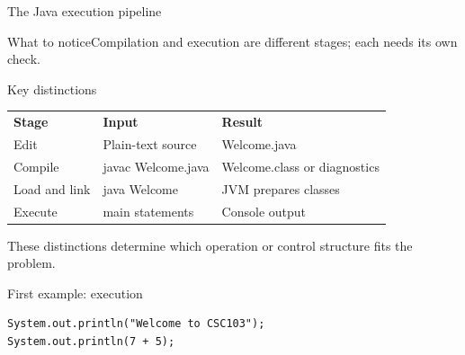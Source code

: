 \documentclass[10pt,aspectratio=169]{beamer}
\begin{document}
\begin{frame}[fragile,t]{The Java execution pipeline}
\begin{center}\end{center}
\begin{block}{What to notice}Compilation and execution are different stages; each needs its own check.\end{block}
\end{frame}
\begin{frame}[fragile,t]{Key distinctions}
\small\renewcommand{\arraystretch}{1.5}
\begin{tabularx}{\textwidth}{>{\raggedright\arraybackslash}X>{\raggedright\arraybackslash}X>{\raggedright\arraybackslash}X}
\rowcolor{navy}
\color{white}\bfseries Stage & \color{white}\bfseries Input & \color{white}\bfseries Result\\
Edit & Plain-text source & Welcome.java\\
Compile & javac Welcome.java & Welcome.class or diagnostics\\
Load and link & java Welcome & JVM prepares classes\\
Execute & main statements & Console output\\
\end{tabularx}
\vspace{3mm}\footnotesize These distinctions determine which operation or control structure fits the problem.
\end{frame}

\begin{frame}[fragile,t]{First example: execution}
\begin{lstlisting}
System.out.println("Welcome to CSC103");
System.out.println(7 + 5);
\end{lstlisting}
\end{frame}
\end{document}
